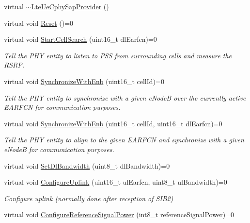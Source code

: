 \begin{DoxyCompactItemize}
\item 
virtual \hyperlink{classns3_1_1LteUeCphySapProvider_aad5a4c97c375f2e892424c8b79f825e3}{$\sim$\+Lte\+Ue\+Cphy\+Sap\+Provider} ()
\item 
virtual void \hyperlink{classns3_1_1LteUeCphySapProvider_ac1bb2efa43542b78fb70da54de579f9f}{Reset} ()=0
\item 
virtual void \hyperlink{classns3_1_1LteUeCphySapProvider_a9644bb55d5ec6d27b0b787f635dbc9ed}{Start\+Cell\+Search} (uint16\+\_\+t dl\+Earfcn)=0
\begin{DoxyCompactList}\small\item\em Tell the P\+HY entity to listen to P\+SS from surrounding cells and measure the R\+S\+RP. \end{DoxyCompactList}\item 
virtual void \hyperlink{classns3_1_1LteUeCphySapProvider_ad906fdd10d4937b67f41f5455dc5cd91}{Synchronize\+With\+Enb} (uint16\+\_\+t cell\+Id)=0
\begin{DoxyCompactList}\small\item\em Tell the P\+HY entity to synchronize with a given e\+NodeB over the currently active E\+A\+R\+F\+CN for communication purposes. \end{DoxyCompactList}\item 
virtual void \hyperlink{classns3_1_1LteUeCphySapProvider_a94c755ff153113110e7b763dd8ee7b42}{Synchronize\+With\+Enb} (uint16\+\_\+t cell\+Id, uint16\+\_\+t dl\+Earfcn)=0
\begin{DoxyCompactList}\small\item\em Tell the P\+HY entity to align to the given E\+A\+R\+F\+CN and synchronize with a given e\+NodeB for communication purposes. \end{DoxyCompactList}\item 
virtual void \hyperlink{classns3_1_1LteUeCphySapProvider_a6b77b03695f82cd342c2462c9fe12e85}{Set\+Dl\+Bandwidth} (uint8\+\_\+t dl\+Bandwidth)=0
\item 
virtual void \hyperlink{classns3_1_1LteUeCphySapProvider_aa24d42854142c74d40a9a334c9e6884b}{Configure\+Uplink} (uint16\+\_\+t ul\+Earfcn, uint8\+\_\+t ul\+Bandwidth)=0
\begin{DoxyCompactList}\small\item\em Configure uplink (normally done after reception of S\+I\+B2) \end{DoxyCompactList}\item 
virtual void \hyperlink{classns3_1_1LteUeCphySapProvider_a6faf0aa83db9a368f85655fb61637c25}{Configure\+Reference\+Signal\+Power} (int8\+\_\+t reference\+Signal\+Power)=0

\end{DoxyCompactItemize}
